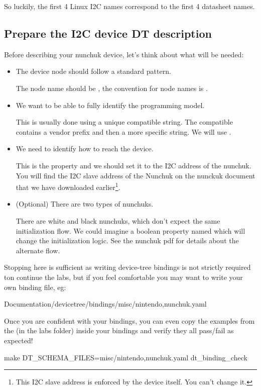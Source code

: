 So luckily, the first 4 Linux I2C names correspond to the first 4 datasheet
names.

\subsection{Prepare the I2C device DT description}

Before describing your nunchuk device, let's think about what will be
needed:
\begin{itemize}
\item The device node should follow a standard pattern.

  The node name should be , the convention for node
  names is .

\item We want to be able to fully identify the programming model.

  This is usually done using a unique compatible string. The compatible
  contains a vendor prefix and then a more specific string. We will use
  .

\item We need to identify how to reach the device.

  This is the  property and we should set it to the I2C
  address of the nunchuk. You will find the I2C slave address of the
  Nunchuk on the nunckuk document that we have downloaded
  earlier\footnote{This I2C slave address is enforced by the device
    itself. You can't change it.}.

\item (Optional) There are two types of nunchuks.

  There are white and black nunchuks, which don't expect the same
  initialization flow. We could imagine a boolean property named
   which will change the initialization
  logic. See the nunchuk pdf for details about the alternate flow.

\end{itemize}

Stopping here is sufficient as writing device-tree bindings is not
strictly required ton continue the labs, but if you feel comfortable
you may want to write your own binding file, eg:
\begin{bashinput}
Documentation/devicetree/bindings/misc/nintendo,nunchuk.yaml
\end{bashinput}
Once you are confident with your bindings, you can even copy the
examples from the  (in the
 labs folder) inside your bindings and verify they all
pass/fail as expected!
\begin{bashinput}
make DT_SCHEMA_FILES=misc/nintendo,nunchuk.yaml dt_binding_check
\end{bashinput}

